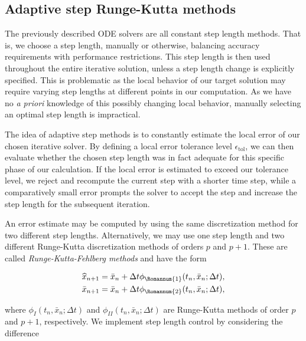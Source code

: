 \subsection{Adaptive step Runge-Kutta methods}\label{sec:adaptive_step}

The previously described ODE solvers are all constant step length methods. That is, we choose a step length, manually or otherwise, balancing accuracy requirements with performance restrictions. This step length is then used throughout the entire iterative solution, unless a step length change is explicitly specified. This is problematic as the local behavior of our target solution may require varying step lengths at different points in our computation. As we have no \textit{a priori} knowledge of this possibly changing local behavior, manually selecting an optimal step length is impractical.

The idea of adaptive step methods is to constantly estimate the local error of our chosen iterative solver. By defining a local error tolerance level $\epsilon_{\text{tol}}$, we can then evaluate whether the chosen step length was in fact adequate for this specific phase of our calculation. If the local error is estimated to exceed our tolerance level, we reject and recompute the current step with a shorter time step, while a comparatively small error prompts the solver to accept the step and increase the step length for the subsequent iteration.

An error estimate may be computed by using the same discretization method for two different step lengths. Alternatively, we may use one step length and two different Runge-Kutta discretization methods of orders $p$ and $p+1$. These are called \textit{Runge-Kutta-Fehlberg methods} \citep{NumericalAnalysis} and have the form

\begin{align}\label{eq:adaptive_step}
\begin{aligned}
\widehat{x}_{n+1} &= \bar{x}_n + \Delta t\phi_{\Romannum{1}}(t_n,\bar{x}_n;\Delta t),\\
\bar{x}_{n+1} &= \bar{x}_n + \Delta t\phi_{\Romannum{2}}(t_n,\bar{x}_n;\Delta t),
\end{aligned}
\end{align}

\noindent where $\phi_{I}(t_n,\bar{x}_n;\Delta t)$ and $\phi_{II}(t_n,\bar{x}_n;\Delta t)$ are Runge-Kutta methods of order $p$ and $p+1$, respectively. We implement step length control by considering the difference

